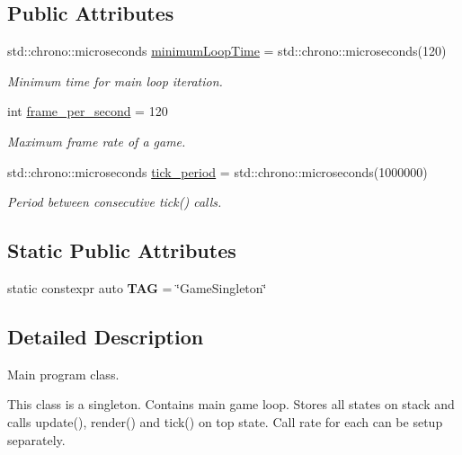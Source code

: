 \subsection*{Public Attributes}
\begin{DoxyCompactItemize}
\item 
std\-::chrono\-::microseconds \hyperlink{classGame_af9f24863bbe8102d1bf5d97aaa449d14}{minimum\-Loop\-Time} = std\-::chrono\-::microseconds(120)
\begin{DoxyCompactList}\small\item\em Minimum time for main loop iteration. \end{DoxyCompactList}\item 
int \hyperlink{classGame_ac57ebbcb3e9f6add9b4bf066c900c0db}{frame\-\_\-per\-\_\-second} = 120
\begin{DoxyCompactList}\small\item\em Maximum frame rate of a game. \end{DoxyCompactList}\item 
std\-::chrono\-::microseconds \hyperlink{classGame_a65800b8c8afee406d719b404a4a78877}{tick\-\_\-period} = std\-::chrono\-::microseconds(1000000)
\begin{DoxyCompactList}\small\item\em Period between consecutive tick() calls. \end{DoxyCompactList}\end{DoxyCompactItemize}
\subsection*{Static Public Attributes}
\begin{DoxyCompactItemize}
\item 
\hypertarget{classGame_a43d300e0d66811f7317d88e3476d6de3}{static constexpr auto {\bfseries T\-A\-G} = \char`\"{}Game\-Singleton\char`\"{}}\label{classGame_a43d300e0d66811f7317d88e3476d6de3}

\end{DoxyCompactItemize}


\subsection{Detailed Description}
Main program class. 

This class is a singleton. Contains main game loop. Stores all states on stack and calls update(), render() and tick() on top state. Call rate for each can be setup separately. 

